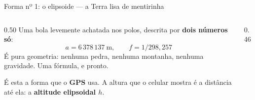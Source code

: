 \documentclass[aspectratio=169,11pt]{beamer}
\newcommand{\bnum}[1]{\textbf{\textcolor{mTeal}{#1}}}
\begin{document}
\begin{frame}{Forma nº 1: o elipsoide --- a Terra lisa de mentirinha}
  \begin{columns}[T]
    \begin{column}{0.50\textwidth}
      Uma bola levemente achatada nos polos, descrita por \bnum{dois números só}:
      \[ a = 6\,378\,137\ \text{m}, \qquad f = 1/298{,}257 \]
      \medskip
      É \alert{pura geometria}: nenhuma pedra, nenhuma montanha, nenhuma gravidade.
      Uma fórmula, e pronto.
      \medskip

      É esta a forma que o \bnum{GPS} usa. A altura que o celular mostra é a distância
      até ela: a \textcolor{corElip}{\textbf{altitude elipsoidal $h$}}.
    \end{column}
    \begin{column}{0.46\textwidth}
      \centering
    \end{column}
  \end{columns}
\end{frame}
\end{document}

